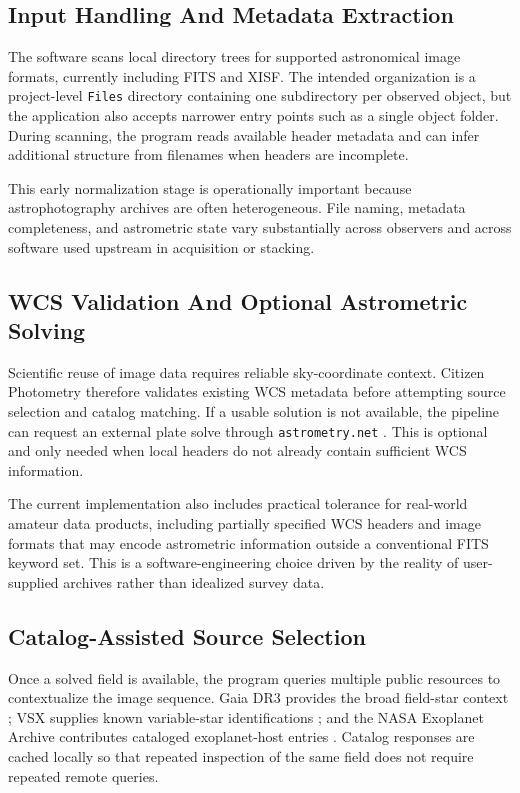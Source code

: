 \documentclass[modern]{aastex701}
\begin{document}
\subsection{Input Handling And Metadata Extraction}\label{subsec:inputs}

The software scans local directory trees for supported astronomical image formats, currently including FITS and XISF. The intended organization is a project-level \texttt{Files} directory containing one subdirectory per observed object, but the application also accepts narrower entry points such as a single object folder. During scanning, the program reads available header metadata and can infer additional structure from filenames when headers are incomplete.

This early normalization stage is operationally important because astrophotography archives are often heterogeneous. File naming, metadata completeness, and astrometric state vary substantially across observers and across software used upstream in acquisition or stacking.

\subsection{WCS Validation And Optional Astrometric Solving}\label{subsec:wcs}

Scientific reuse of image data requires reliable sky-coordinate context. Citizen Photometry therefore validates existing WCS metadata before attempting source selection and catalog matching. If a usable solution is not available, the pipeline can request an external plate solve through \texttt{astrometry.net} \citep{astrometrynet}. This is optional and only needed when local headers do not already contain sufficient WCS information.

The current implementation also includes practical tolerance for real-world amateur data products, including partially specified WCS headers and image formats that may encode astrometric information outside a conventional FITS keyword set. This is a software-engineering choice driven by the reality of user-supplied archives rather than idealized survey data.

\subsection{Catalog-Assisted Source Selection}\label{subsec:catalogs}

Once a solved field is available, the program queries multiple public resources to contextualize the image sequence. Gaia DR3 provides the broad field-star context \citep{gaia-dr3}; VSX supplies known variable-star identifications \citep{vsx}; and the NASA Exoplanet Archive contributes cataloged exoplanet-host entries \citep{nasa-exoplanet-archive}. Catalog responses are cached locally so that repeated inspection of the same field does not require repeated remote queries.
\end{document}

